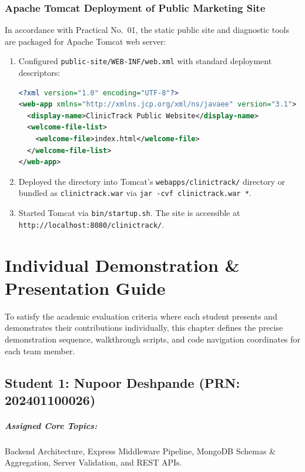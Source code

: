 \documentclass[12pt,a4paper,oneside]{report}
\begin{document}
\subsection{Apache Tomcat Deployment of Public Marketing Site}
In accordance with Practical No.~01, the static public site and diagnostic tools are packaged for Apache Tomcat web server:
\begin{enumerate}
    \item Configured \texttt{public-site/WEB-INF/web.xml} with standard deployment descriptors:
\begin{lstlisting}[language=XML, caption={Apache Tomcat web.xml Deployment Descriptor}]
<?xml version="1.0" encoding="UTF-8"?>
<web-app xmlns="http://xmlns.jcp.org/xml/ns/javaee" version="3.1">
  <display-name>ClinicTrack Public Website</display-name>
  <welcome-file-list>
    <welcome-file>index.html</welcome-file>
  </welcome-file-list>
</web-app>
\end{lstlisting}
    \item Deployed the directory into Tomcat's \texttt{webapps/clinictrack/} directory or bundled as \texttt{clinictrack.war} via \texttt{jar -cvf clinictrack.war *}.
    \item Started Tomcat via \texttt{bin/startup.sh}. The site is accessible at \texttt{http://localhost:8080/clinictrack/}.
\end{enumerate}

\chapter{Individual Demonstration \& Presentation Guide}

To satisfy the academic evaluation criteria where each student presents and demonstrates their contributions individually, this chapter defines the precise demonstration sequence, walkthrough scripts, and code navigation coordinates for each team member.

\section{Student 1: Nupoor Deshpande (PRN: 202401100026)}
\paragraph{Assigned Core Topics:} Backend Architecture, Express Middleware Pipeline, MongoDB Schemas \& Aggregation, Server Validation, and REST APIs.
\end{document}
